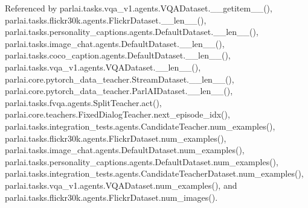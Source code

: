 Referenced by parlai.\+tasks.\+vqa\+\_\+v1.\+agents.\+V\+Q\+A\+Dataset.\+\_\+\+\_\+getitem\+\_\+\+\_\+(), parlai.\+tasks.\+flickr30k.\+agents.\+Flickr\+Dataset.\+\_\+\+\_\+len\+\_\+\+\_\+(), parlai.\+tasks.\+personality\+\_\+captions.\+agents.\+Default\+Dataset.\+\_\+\+\_\+len\+\_\+\+\_\+(), parlai.\+tasks.\+image\+\_\+chat.\+agents.\+Default\+Dataset.\+\_\+\+\_\+len\+\_\+\+\_\+(), parlai.\+tasks.\+coco\+\_\+caption.\+agents.\+Default\+Dataset.\+\_\+\+\_\+len\+\_\+\+\_\+(), parlai.\+tasks.\+vqa\+\_\+v1.\+agents.\+V\+Q\+A\+Dataset.\+\_\+\+\_\+len\+\_\+\+\_\+(), parlai.\+core.\+pytorch\+\_\+data\+\_\+teacher.\+Stream\+Dataset.\+\_\+\+\_\+len\+\_\+\+\_\+(), parlai.\+core.\+pytorch\+\_\+data\+\_\+teacher.\+Parl\+A\+I\+Dataset.\+\_\+\+\_\+len\+\_\+\+\_\+(), parlai.\+tasks.\+fvqa.\+agents.\+Split\+Teacher.\+act(), parlai.\+core.\+teachers.\+Fixed\+Dialog\+Teacher.\+next\+\_\+episode\+\_\+idx(), parlai.\+tasks.\+integration\+\_\+tests.\+agents.\+Candidate\+Teacher.\+num\+\_\+examples(), parlai.\+tasks.\+flickr30k.\+agents.\+Flickr\+Dataset.\+num\+\_\+examples(), parlai.\+tasks.\+image\+\_\+chat.\+agents.\+Default\+Dataset.\+num\+\_\+examples(), parlai.\+tasks.\+personality\+\_\+captions.\+agents.\+Default\+Dataset.\+num\+\_\+examples(), parlai.\+tasks.\+integration\+\_\+tests.\+agents.\+Candidate\+Teacher\+Dataset.\+num\+\_\+examples(), parlai.\+tasks.\+vqa\+\_\+v1.\+agents.\+V\+Q\+A\+Dataset.\+num\+\_\+examples(), and parlai.\+tasks.\+flickr30k.\+agents.\+Flickr\+Dataset.\+num\+\_\+images().

